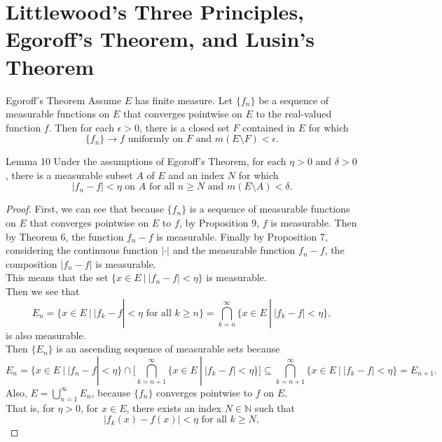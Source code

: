 \section{Littlewood's Three Principles, Egoroff's Theorem, and Lusin's Theorem}
\begin{flushleft}
    \begin{namedthm*}{Egoroff's Theorem}
        Assume $E$ has finite measure. Let $\{f_n\}$ be a sequence of measurable functions on $E$ that converges pointwise on $E$ to the real-valued function $f$.
        Then for each $\epsilon>0$, there is a closed set $F$ contained in $E$ for which     
        \[
            \{f_n\}\to f\text{ uniformly on }F\text{ and }m(E\setminus F)<\epsilon.    
        \]
    \end{namedthm*}
    \begin{namedthm*}{Lemma 10}
        Under the assumptions of Egoroff's Theorem, for each $\eta>0$ and $\delta>0$, there is a measurable subset $A$ of $E$ and an index $N$ for which
        \[
            |f_n-f|<\eta\text{ on }A\text{ for all }n\ge N\text{ and }m(E\setminus A)<\delta.    
        \]
    \end{namedthm*}
    \begin{proof}
        First, we can see that because $\{f_n\}$ is a sequence of measurable functions on $E$ that converges pointwise on $E$ to $f$, by Proposition 9, $f$ is measurable.
        Then by Theorem 6, the function $f_n-f$ is measurable.
        Finally by Proposition 7, considering the continuous function $|\cdot|$ and the measurable function $f_n-f$, the composition $|f_n-f|$ is measurable.
        \\This means that the set $\{x\in E\ |\ |f_n-f|<\eta\}$ is measurable.
        \\Then we see that
        \[
            E_n=\{x\in E\ |\ |f_k-f|<\eta\text{ for all }k\ge n\}=\bigcap_{k=n}^\infty\{x\in E\ |\ |f_k-f|<\eta\},
        \]
        is also measurable.
        \\Then $\{E_n\}$ is an ascending sequence of measurable sets because 
        \[
            E_n=\{x\in E\ |\ |f_n-f|<\eta\}\cap\biggl[\bigcap_{k={n+1}}^\infty\{x\in E\ |\ |f_k-f|<\eta\}\biggr]\subseteq \bigcap_{k={n+1}}^\infty\{x\in E\ |\ |f_k-f|<\eta\}=E_{n+1}.
        \]
        Also, $E=\bigcup_{n=1}^\infty E_n$, because $\{f_n\}$ converges pointwise to $f$ on $E$. 
        \\That is, for $\eta>0$, for $x\in E$, there exists an index $N\in\mathbb{N}$ such that
        \[
            |f_k(x)-f(x)|<\eta\text{ for all }k\ge N,
\]
\end{proof}
\end{flushleft}
